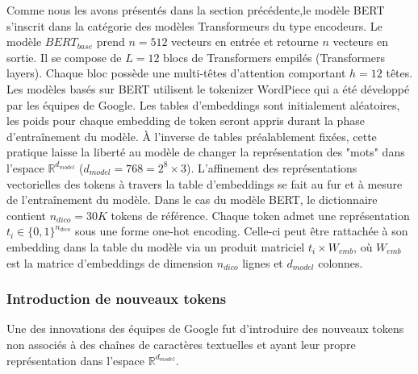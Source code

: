 \documentclass[12pt]{article}
\theoremstyle{definition}
\begin{document}
Comme nous les avons présentés dans la section précédente,le modèle BERT s’inscrit dans la catégorie des modèles Transformeurs du type encodeurs. Le modèle $BERT_{base}$ prend $n=512$ vecteurs en entrée et retourne $n$ vecteurs en sortie. Il se compose de $L=12$ blocs de Transformers empilés (Transformers layers). Chaque bloc possède une multi-têtes d’attention comportant $h=12$ têtes. Les modèles basés sur BERT utilisent le tokenizer WordPiece qui a été développé par les équipes de Google. Les tables d'embeddings sont initialement aléatoires, les poids pour chaque embedding de token seront appris durant la phase d’entraînement du modèle. À l’inverse de tables préalablement fixées, cette pratique laisse la liberté au modèle de changer la représentation des "mots" dans l’espace $\mathbb{R}^{d_{model}}$ ($d_{model} = 768 = 2^8 \times 3$). L’affinement des représentations vectorielles des tokens à travers la table d'embeddings se fait au fur et à mesure de l’entraînement du modèle. Dans le cas du modèle BERT, le dictionnaire contient $n_{dico} = 30K$ tokens de référence. Chaque token admet une représentation  $t_i \in\{0,1\}^{n_{dico}}$ sous une forme one-hot encoding. Celle-ci peut être rattachée à son embedding dans la table du modèle via un produit matriciel $t_{i} \times W_{emb}$, où $W_{emb}$ est la matrice d'embeddings de dimension $n_{dico}$ lignes et $d_{model}$ colonnes.


\subsubsection{Introduction de nouveaux tokens}

Une des innovations des équipes de Google fut d'introduire des nouveaux tokens non associés à des chaînes de caractères textuelles et ayant leur propre représentation dans l'espace $\mathbb{R}^{d_{model}}$.  
\end{document}
